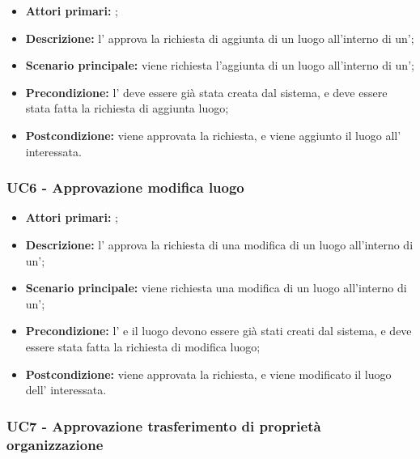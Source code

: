 \documentclass[../analisi-dei-requisiti]{subfiles}
\begin{document}
\begin{itemize}
\item \textbf{Attori primari:} ;
\item \textbf{Descrizione:} l' approva la richiesta di aggiunta di un luogo all'interno di un';
\item \textbf{Scenario principale:} viene richiesta l'aggiunta di un luogo all'interno di un';
\item \textbf{Precondizione:} l' deve essere già stata creata dal sistema, e deve essere stata fatta la richiesta di aggiunta luogo;
\item \textbf{Postcondizione:} viene approvata la richiesta, e viene aggiunto il luogo all' interessata.

\end{itemize}
\subsubsection{UC6 - Approvazione modifica luogo}
\label{subsub:UC6}

\begin{itemize}
\item \textbf{Attori primari:} ;
\item \textbf{Descrizione:} l' approva la richiesta di una modifica di un luogo all'interno di un';
\item \textbf{Scenario principale:} viene richiesta una modifica di un luogo all'interno di un';
\item \textbf{Precondizione:} l' e il luogo devono essere già stati creati dal sistema, e deve essere stata fatta la richiesta di modifica luogo;
\item \textbf{Postcondizione:} viene approvata la richiesta, e viene modificato il luogo dell' interessata.

\end{itemize}
\subsubsection{UC7 - Approvazione trasferimento di proprietà organizzazione}
\label{subsub:UC7}
\end{document}
